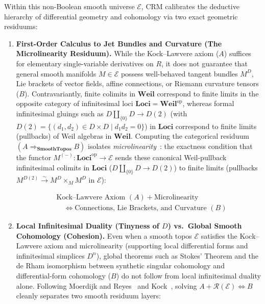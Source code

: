\documentclass[10pt,twoside,openright]{book}
\theoremstyle{crmplain}
\theoremstyle{crmdef}
\theoremstyle{crmremark}
\begin{document}
Within this non-Boolean smooth universe $\mathcal{E}$, $\mathrm{CRM}$ calibrates the deductive hierarchy of differential geometry and cohomology via two exact geometric residuums:

\begin{enumerate}[label=\textbf{\arabic*.},leftmargin=1.8em]

  \item \textbf{First-Order Calculus to Jet Bundles and Curvature (The Microlinearity Residuum).} While the Kock--Lawvere axiom ($A$) suffices for elementary single-variable derivatives on $R$, it does not guarantee that general smooth manifolds $M \in \mathcal{E}$ possess well-behaved tangent bundles $M^D$, Lie brackets of vector fields, affine connections, or Riemann curvature tensors ($B$). Contravariantly, finite colimits in $\mathbf{Weil}$ correspond to finite limits in the opposite category of infinitesimal loci $\mathbf{Loci} = \mathbf{Weil}^{\mathrm{op}}$, whereas formal infinitesimal gluings such as $D \amalg_{\{0\}} D \to D(2)$ (with $D(2) = \{(d_1, d_2) \in D \times D \mid d_1 d_2 = 0\}$) in $\mathbf{Loci}$ correspond to finite limits (pullbacks) of Weil algebras in $\mathbf{Weil}$. Computing the categorical residuum $(A \Rightarrow_{\mathbf{SmoothTopos}} B)$ isolates \emph{microlinearity}~\cite{Kock06,MoerdijkReyes91}: the exactness condition that the functor $M^{(-)} : \mathbf{Loci}^{\mathrm{op}} \to \mathcal{E}$ sends these canonical Weil-pullback infinitesimal colimits in $\mathbf{Loci}$ ($D \amalg_{\{0\}} D \to D(2)$) to finite limits (pullbacks $M^{D(2)} \xrightarrow{\sim} M^D \times_M M^D$ in $\mathcal{E}$):

\[
  \begin{aligned}
    &\text{Kock--Lawvere Axiom } (A) + \text{Microlinearity} \\
    &\quad\Longleftrightarrow \text{Connections, Lie Brackets, and Curvature } (B)
  \end{aligned}
\]

  \item \textbf{Local Infinitesimal Duality (Tinyness of $D$) vs.\ Global Smooth Cohomology (Cohesion).} Even when a smooth topos $\mathcal{E}$ satisfies the Kock--Lawvere axiom and microlinearity (supporting local differential forms and infinitesimal simplices $D^n$), global theorems such as Stokes' Theorem and the de Rham isomorphism between synthetic singular cohomology and differential-form cohomology ($B$) do not follow from local infinitesimal duality alone. Following Moerdijk and Reyes~\cite[Ch.~III, Thm.~1.10 \& \S 2]{MoerdijkReyes91} and Kock~\cite{Kock06}, solving $A + \mathcal{R}(\mathcal{E}) \iff B$ cleanly separates two smooth residuum layers:


\end{enumerate}
\end{document}
